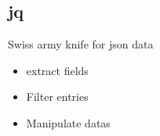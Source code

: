 \subsection{jq}

\begin{frame}[fragile]{Swiss army knife for json data}
  \begin{itemize}
    \pause \item extract fields
    \pause \item Filter entries
    \pause \item Manipulate datas
  \end{itemize}
\end{frame}

